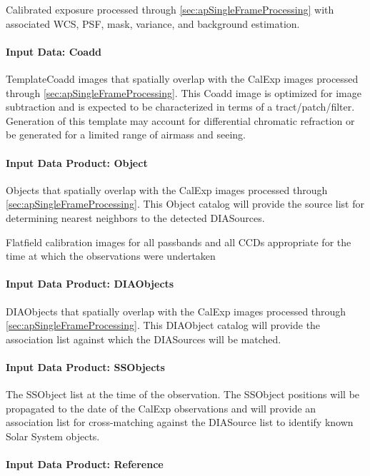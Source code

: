 Calibrated exposure processed through \ref{sec:apSingleFrameProcessing} with associated WCS, PSF, mask, variance, and background estimation.

\paragraph{Input Data: Coadd}

TemplateCoadd images that spatially overlap with the CalExp images processed through \ref{sec:apSingleFrameProcessing}. This Coadd image is optimized for image subtraction and is expected to be characterized in terms of a tract/patch/filter. Generation of this template may account for differential chromatic refraction or be generated for a limited range of airmass and seeing.

\paragraph{Input Data Product: Object}

Objects that spatially overlap with the CalExp images processed through \ref{sec:apSingleFrameProcessing}. This Object catalog will provide the source list for determining nearest neighbors to the detected DIASources. 

Flatfield calibration images for all passbands and all CCDs appropriate for the time at which the observations were undertaken 

\paragraph{Input Data Product: DIAObjects}

DIAObjects that spatially overlap with the CalExp images processed through \ref{sec:apSingleFrameProcessing}. This DIAObject catalog will provide the association  list against which the DIASources will be matched. 

\paragraph{Input Data Product: SSObjects}

The SSObject list at the time of the observation. The SSObject positions will be propagated to the date of the CalExp observations and will provide an association  list for cross-matching against the DIASource list to identify known Solar System objects.

\paragraph{Input Data Product: Reference}

